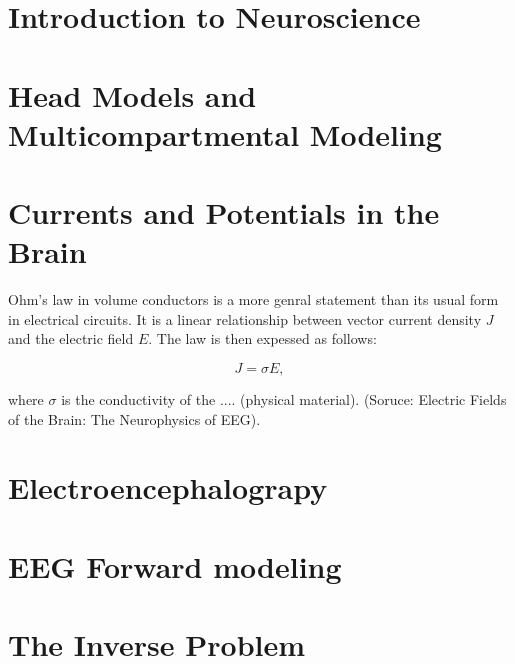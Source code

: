 \documentclass[a4paper, UKenglish, 11pt]{uiomaster}
\begin{document}
%
%
\section{Introduction to Neuroscience}


\section{Head Models and Multicompartmental Modeling }

\section{Currents and Potentials in the Brain}
Ohm's law in volume conductors is a more genral statement than its usual form in electrical circuits. It is a linear relationship between vector current density $J$ and the electric field $E$. The law is then expessed as follows:

\begin{equation}
J = \sigma E,
\label{eq:ohms_law}
\end{equation}

where $\sigma$ is the conductivity of the .... (physical material). (Soruce: Electric Fields of the Brain: The Neurophysics of EEG).


































\section{Electroencephalograpy}
\section{EEG Forward modeling}
\section{The Inverse Problem}
\end{document}
